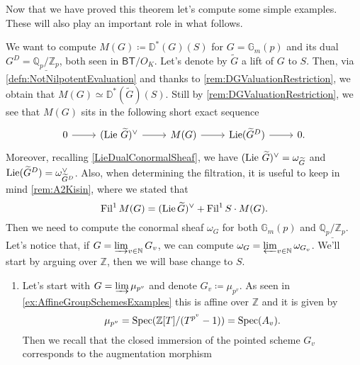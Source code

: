 \noindent
Now that we have proved this theorem let's compute some simple examples.
These will also play an important role in what follows.
\begin{ex}[]\label{DieudonneModulesSimpleExamples}
	We want to compute $M(G) \coloneqq \mathbb{D}^*(G)(S)$ for
	$G = \mathbb{G}_m(p)$ and its dual 
	$G^D = \underline{\mathbb{Q}_p/\mathbb{Z}_{p}}$,
	both seen in $\mathsf{BT}/O_K$.
	Let's denote by $\widetilde{G}$ a lift of $G$ to $S$.
	Then, via \cref{defn:NotNilpotentEvaluation} and thanks to \cref{rem:DGValuationRestriction},
	we obtain that $M(G) \simeq \mathbb{D}^*(\widetilde{G})(S)$.
	Still by \cref{rem:DGValuationRestriction}, we see that $M(G)$
	sits in the following short exact sequence
	\begin{equation}\label{eqn:MGSES}
	\begin{tikzcd}
		0 \arrow[r, "", rightarrow] &
		( \lie\, \widetilde{G} )^\vee \arrow[r, "", rightarrow] &
		M(G) \arrow[r, "", rightarrow] &
		\lie(\widetilde{G}^D) \arrow[r, "", rightarrow] &
		0
	.\end{tikzcd}
	\end{equation}
	Moreover, recalling \cref{LieDualConormalSheaf}, we have
	$(\operatorname{Lie}\, \widetilde{G})^\vee = \omega_{\widetilde{G}}$ and
	$\operatorname{Lie}(\widetilde{G}^D) = \omega_{\widetilde{G}^D}^\vee$.
	Also, when determining the filtration, it is useful to keep
	in mind \cref{rem:A2Kisin}, where we stated that 
	\begin{equation*}
		\operatorname{Fil}^1 M(G) =
		( \operatorname{Lie} \widetilde{G} )^\vee +
		\operatorname{Fil}^1S \cdot M(G)
	.\end{equation*}
	Then we need to compute the conormal sheaf $\omega_G$ for both
	$\mathbb{G}_m(p)$ and $\underline{\mathbb{Q}_p/\mathbb{Z}_{p}}$.
	Let's notice that, if $G = \varinjlim_{v \in \mathbb{N}} G_v$, we
	can compute $\omega_G = \varprojlim_{v \in \mathbb{N}} \omega_{G_v}$.
	We'll start by arguing over $\mathbb{Z}$, then we will base change
	to $S$.
\begin{enumerate}
	\item Let's start with $G = \varinjlim \mu_{p^v}$ and denote $G_v \coloneqq \mu_{p^v}$.
		As seen in \cref{ex:AffineGroupSchemesExamples} this is affine over
		$\mathbb{Z}$ and it is given by
		\begin{equation*}
			\mu_{p^v} = \operatorname{Spec}(\mathbb{Z}[T]/ (T^{p^v} - 1)) = \operatorname{Spec}(A_v)
		.\end{equation*}
		Then we recall that the closed immersion of the pointed
		scheme $G_v$ corresponds to the augmentation morphism
		\begin{equation*}

\end{equation*}
\end{enumerate}
\end{ex}

